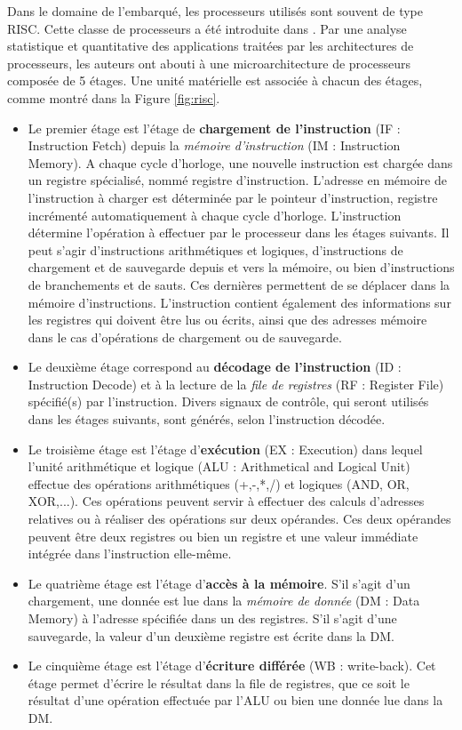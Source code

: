 Dans le domaine de l'embarqué, les processeurs utilisés sont souvent de type RISC. Cette classe de processeurs a été introduite dans \cite{hennessy2011computer}. Par une analyse statistique et quantitative des applications traitées par les architectures de processeurs, les auteurs ont abouti à une microarchitecture de processeurs composée de 5 étages. Une unité matérielle est associée à chacun des étages, comme montré dans la Figure \ref{fig:risc}.

\begin{itemize}
  \item Le premier étage est l'étage de \textbf{chargement de l'instruction} (IF : Instruction Fetch) depuis la \textit{mémoire d'instruction} (IM : Instruction Memory). A chaque cycle d'horloge, une nouvelle instruction est chargée dans un registre spécialisé, nommé registre d'instruction. L'adresse en mémoire de l'instruction à charger est déterminée par le pointeur d'instruction, registre incrémenté automatiquement à chaque cycle d'horloge. L'instruction détermine l'opération à effectuer par le processeur dans les étages suivants. Il peut s'agir d'instructions arithmétiques et logiques, d'instructions de chargement et de sauvegarde depuis et vers la mémoire, ou bien d'instructions de branchements et de sauts. Ces dernières permettent de se déplacer dans la mémoire d'instructions. L'instruction contient également des informations sur les registres qui doivent être lus ou écrits, ainsi que des adresses mémoire dans le cas d'opérations de chargement ou de sauvegarde.

  \item Le deuxième étage correspond au \textbf{décodage de l'instruction} (ID : Instruction Decode) et à la lecture de la \textit{file de registres} (RF : Register File) spécifié(s) par l'instruction. Divers signaux de contrôle, qui seront utilisés dans les étages suivants, sont générés, selon l'instruction décodée.

  \item Le troisième étage est l'étage d'\textbf{exécution} (EX : Execution) dans lequel l'unité arithmétique et logique (ALU : Arithmetical and Logical Unit) effectue des opérations arithmétiques (+,-,*,/) et logiques (AND, OR, XOR,...). Ces opérations peuvent servir à effectuer des calculs d'adresses relatives ou à réaliser des opérations sur deux opérandes. Ces deux opérandes peuvent être deux registres ou bien un registre et une valeur immédiate intégrée dans l'instruction elle-même.

  \item Le quatrième étage est l'étage d'\textbf{accès à la mémoire}. S'il s'agit d'un chargement, une donnée est lue dans la \textit{mémoire de donnée} (DM : Data Memory) à l'adresse spécifiée dans un des registres. S'il s'agit d'une sauvegarde, la valeur d'un deuxième registre est écrite dans la DM.

  \item Le cinquième étage est l'étage d'\textbf{écriture différée} (WB : write-back). Cet étage permet d'écrire le résultat dans la file de registres, que ce soit le résultat d'une opération effectuée par l'ALU ou bien une donnée lue dans la DM.
\end{itemize}

